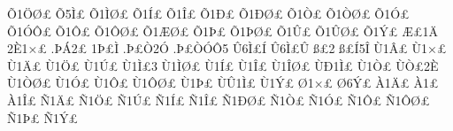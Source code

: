{^^d51^^d6^^d8^^a3
^^d55^^cc^^a3
^^d51^^cc^^d8^^a3
^^d51^^cd^^a3
^^d51^^ce^^a3
^^d51^^d0^^a3
^^d51^^d0^^d8^^a3
^^d51^^d2^^a3
^^d51^^d2^^d8^^a3
^^d51^^d3^^a3
^^d51^^d3^^d4^^a3
^^d51^^d4^^a3
^^d51^^d4^^d8^^a3
^^d51^^c6^^d8^^a3
^^d51^^de^^a3
^^d51^^de^^d8^^a3
^^d51^^db^^a3
^^d51^^db^^d8^^a3
^^d51^^dd^^a3
^^c6^^a31^^c4
2^^c81^^d7^^a3
.^^de^^c12^^a3
1^^de^^a3^^cc
.^^de^^a3^^d22^^d3
.^^de^^a3^^d2^^d3^^d45
^^db6^^cc^^a3^^cd
^^db6^^cc^^a3^^db
^^df^^a32
^^df^^a3^^cd5^^ce
^^d91^^c2^^a3
^^d91^^d7^^a3
^^d91^^c4^^a3
^^d91^^d6^^a3
^^d91^^da^^a3
^^d91^^cc^^a33
^^d91^^cc^^d8^^a3
^^d91^^cd^^a3
^^d91^^ce^^a3
^^d91^^ce^^d8^^a3
^^d9^^d01^^cc^^a3
^^d91^^d2^^a3
^^d9^^d2^^a32^^c8
^^d91^^d2^^d8^^a3
^^d91^^d3^^a3
^^d91^^d4^^a3
^^d91^^d4^^d8^^a3
^^d91^^de^^a3
^^d9^^db1^^cc^^a3
^^d91^^dd^^a3
^^d81^^d7^^a3
^^d86^^dd^^a3
^^c01^^c4^^a3
^^c01^^a3
^^c01^^ce^^a3
^^d11^^c4^^a3
^^d11^^d6^^a3
^^d11^^da^^a3
^^d11^^cd^^a3
^^d11^^ce^^a3
^^d11^^d0^^d8^^a3
^^d11^^d2^^a3
^^d11^^d3^^a3
^^d11^^d4^^a3
^^d11^^d4^^d8^^a3
^^d11^^de^^a3
^^d11^^dd^^a3
}
